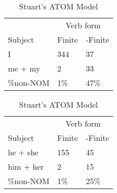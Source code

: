 \begin{table}[]
    \caption{Stuart's ATOM Model}
    \begin{minipage}{0.5\textwidth}
    \centering
    \begin{tabular}{@{}lll@{}}
        \toprule
         &\multicolumn{2}{c}{Verb form}\\
         \cline{2-3}
        Subject & Finite & -Finite \\
        \midrule
        I & 344 & 37 \\
        me + my & 2 & 33 \\
        \hline
        \%non-NOM & 1\% & 47\% \\
        \bottomrule
    \end{tabular}
\end{minipage}
\begin{minipage}{0.5\textwidth}
    \centering
    \begin{tabular}{@{}lll@{}}
        \toprule
         &\multicolumn{2}{c}{Verb form}\\
         \cline{2-3}
        Subject & Finite & -Finite \\
        \midrule
        he + she & 155 & 45 \\
        him + her & 2 & 15 \\
        \hline
        \%non-NOM & 1\% & 25\% \\
        \bottomrule
    \end{tabular}
    \end{minipage}
    \begin{minipage}{0.5\textwidth}
    

\end{minipage}
\end{table}

